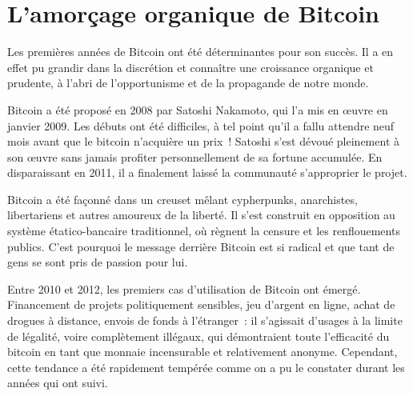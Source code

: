 \section*{L'amorçage organique de Bitcoin}

Les premières années de Bitcoin ont été déterminantes pour son succès. Il a en effet pu grandir dans la discrétion et connaître une croissance organique et prudente, à l'abri de l'opportunisme et de la propagande de notre monde.

Bitcoin a été proposé en 2008 par Satoshi Nakamoto, qui l'a mis en œuvre en janvier 2009. Les débuts ont été difficiles, à tel point qu'il a fallu attendre neuf mois avant que le bitcoin n'acquière un prix~! Satoshi s'est dévoué pleinement à son œuvre sans jamais profiter personnellement de sa fortune accumulée. En disparaissant en 2011, il a finalement laissé la communauté s'approprier le projet.

Bitcoin a été façonné dans un creuset mêlant cypherpunks, anarchistes, libertariens et autres amoureux de la liberté. Il s'est construit en opposition au système étatico-bancaire traditionnel, où règnent la censure et les renflouements publics. C'est pourquoi le message derrière Bitcoin est si radical et que tant de gens se sont pris de passion pour lui.

Entre 2010 et 2012, les premiers cas d'utilisation de Bitcoin ont émergé. Financement de projets politiquement sensibles, jeu d'argent en ligne, achat de drogues à distance, envois de fonds à l'étranger~: il s'agissait d'usages à la limite de légalité, voire complètement illégaux, qui démontraient toute l'efficacité du bitcoin en tant que monnaie incensurable et relativement anonyme. Cependant, cette tendance a été rapidement tempérée comme on a pu le constater durant les années qui ont suivi.
